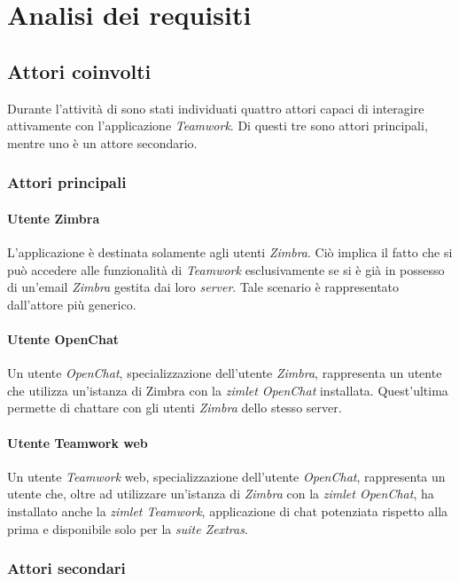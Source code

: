 
\chapter{Analisi dei requisiti}\label{chap:requirements}

\section{Attori coinvolti}
Durante l'attività di  sono stati individuati quattro 
attori capaci di interagire attivamente con l'applicazione \emph{Teamwork}. 
Di questi tre sono attori principali, mentre uno è un attore secondario.
\subsection{Attori principali}
\subsubsection{Utente Zimbra}
L'applicazione è destinata solamente agli utenti \emph{Zimbra}. Ciò implica il fatto che si può accedere alle funzionalità di \emph{Teamwork} esclusivamente se si è già in 
possesso di un'email \emph{Zimbra} gestita dai loro \emph{server}. Tale scenario è
rappresentato dall'attore più generico.
\subsubsection{Utente OpenChat}
Un utente \emph{OpenChat}, specializzazione dell'utente \emph{Zimbra}, rappresenta un utente che utilizza un'istanza di Zimbra con la \emph{zimlet OpenChat} installata. Quest'ultima permette di chattare con gli utenti \emph{Zimbra} dello stesso server.

\subsubsection{Utente Teamwork web}
Un utente \emph{Teamwork} web, specializzazione dell'utente \emph{OpenChat}, rappresenta 
un utente che, oltre ad utilizzare un'istanza di \emph{Zimbra} con la \emph{zimlet OpenChat}, 
ha installato anche la \emph{zimlet Teamwork}, applicazione di chat potenziata rispetto 
alla prima e disponibile solo per la \emph{suite Zextras}.

\subsection{Attori secondari}
